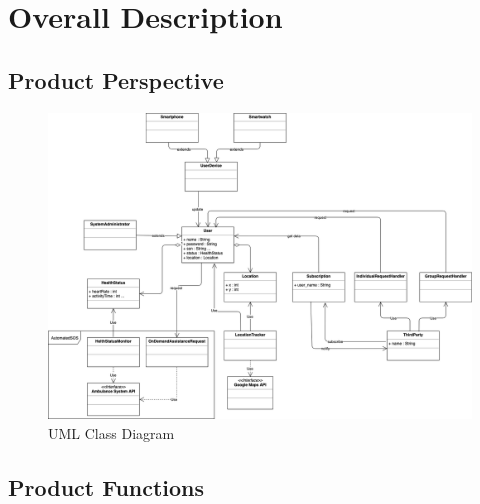 \documentclass[12pt,a4paper]{article}
\begin{document}
	\newpage
	\section{Overall Description}
	
		\subsection{Product Perspective}
		
		\begin{figure}[h]
			\includegraphics[width=1.25\linewidth]{Images/uml}
			\caption{UML Class Diagram}
			\label{fig:uml}
		\end{figure}
		
		
		\subsection{Product Functions}
		
\end{document}
